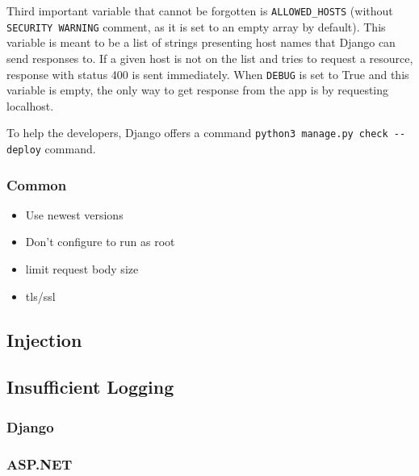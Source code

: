 Third important variable that cannot be forgotten is \lstinline{ALLOWED_HOSTS} (without \lstinline{SECURITY WARNING} comment, as it is set to an empty array by default). This variable is meant to be a list of strings presenting host names that Django can send responses to. If a given host is not on the list and tries to request a resource, response with status 400 is sent immediately. When \lstinline{DEBUG} is set to True and this variable is empty, the only way to get response from the app is by requesting localhost.

To help the developers, Django offers a command \lstinline{python3 manage.py check --deploy} command.


\subsubsection{Common}
\begin{itemize}
    \item Use newest versions
    \item Don't configure to run as root
    \item limit request body size
    \item tls/ssl
\end{itemize}

\subsection{Injection}




\subsection{Insufficient Logging}
\subsubsection{Django}
\subsubsection{ASP.NET}
